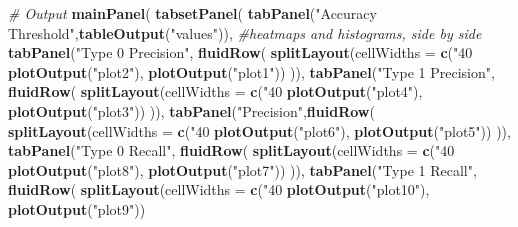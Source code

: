 \documentclass[10pt,letterpaper]{article}
\newenvironment{Shaded}{\begin{snugshade}}{\end{snugshade}}
\newcommand{\KeywordTok}[1]{\textcolor[rgb]{0.13,0.29,0.53}{\textbf{{#1}}}}
\newcommand{\DataTypeTok}[1]{\textcolor[rgb]{0.13,0.29,0.53}{{#1}}}
\newcommand{\StringTok}[1]{\textcolor[rgb]{0.31,0.60,0.02}{{#1}}}
\newcommand{\CommentTok}[1]{\textcolor[rgb]{0.56,0.35,0.01}{\textit{{#1}}}}
\newcommand{\NormalTok}[1]{{#1}}
\begin{document}
\begin{Shaded}
\begin{Highlighting}[]
    \CommentTok{# Output}
    \KeywordTok{mainPanel}\NormalTok{(}
      \KeywordTok{tabsetPanel}\NormalTok{(}
        \KeywordTok{tabPanel}\NormalTok{(}\StringTok{"Accuracy Threshold"}\NormalTok{,}\KeywordTok{tableOutput}\NormalTok{(}\StringTok{"values"}\NormalTok{)),}
        \CommentTok{#heatmaps and histograms, side by side}
        \KeywordTok{tabPanel}\NormalTok{(}\StringTok{"Type 0 Precision"}\NormalTok{, }\KeywordTok{fluidRow}\NormalTok{(}
          \KeywordTok{splitLayout}\NormalTok{(}\DataTypeTok{cellWidths =} \KeywordTok{c}\NormalTok{(}\StringTok{"40%
                      \KeywordTok{plotOutput}\NormalTok{(}\StringTok{"plot2"}\NormalTok{), }\KeywordTok{plotOutput}\NormalTok{(}\StringTok{"plot1"}\NormalTok{))}
          \NormalTok{)), }
        \KeywordTok{tabPanel}\NormalTok{(}\StringTok{"Type 1 Precision"}\NormalTok{, }\KeywordTok{fluidRow}\NormalTok{(}
          \KeywordTok{splitLayout}\NormalTok{(}\DataTypeTok{cellWidths =} \KeywordTok{c}\NormalTok{(}\StringTok{"40%
                      \KeywordTok{plotOutput}\NormalTok{(}\StringTok{"plot4"}\NormalTok{), }\KeywordTok{plotOutput}\NormalTok{(}\StringTok{"plot3"}\NormalTok{))}
          \NormalTok{)),}
        \KeywordTok{tabPanel}\NormalTok{(}\StringTok{"Precision"}\NormalTok{,}\KeywordTok{fluidRow}\NormalTok{(}
          \KeywordTok{splitLayout}\NormalTok{(}\DataTypeTok{cellWidths =} \KeywordTok{c}\NormalTok{(}\StringTok{"40%
                      \KeywordTok{plotOutput}\NormalTok{(}\StringTok{"plot6"}\NormalTok{), }\KeywordTok{plotOutput}\NormalTok{(}\StringTok{"plot5"}\NormalTok{))}
          \NormalTok{)),}
        \KeywordTok{tabPanel}\NormalTok{(}\StringTok{"Type 0 Recall"}\NormalTok{, }\KeywordTok{fluidRow}\NormalTok{(}
          \KeywordTok{splitLayout}\NormalTok{(}\DataTypeTok{cellWidths =} \KeywordTok{c}\NormalTok{(}\StringTok{"40%
                      \KeywordTok{plotOutput}\NormalTok{(}\StringTok{"plot8"}\NormalTok{), }\KeywordTok{plotOutput}\NormalTok{(}\StringTok{"plot7"}\NormalTok{))}
        \NormalTok{)), }
        \KeywordTok{tabPanel}\NormalTok{(}\StringTok{"Type 1 Recall"}\NormalTok{, }\KeywordTok{fluidRow}\NormalTok{(}
          \KeywordTok{splitLayout}\NormalTok{(}\DataTypeTok{cellWidths =} \KeywordTok{c}\NormalTok{(}\StringTok{"40%
                      \KeywordTok{plotOutput}\NormalTok{(}\StringTok{"plot10"}\NormalTok{), }\KeywordTok{plotOutput}\NormalTok{(}\StringTok{"plot9"}\NormalTok{))}
}}}}}
\end{Highlighting}
\end{Shaded}
\end{document}
